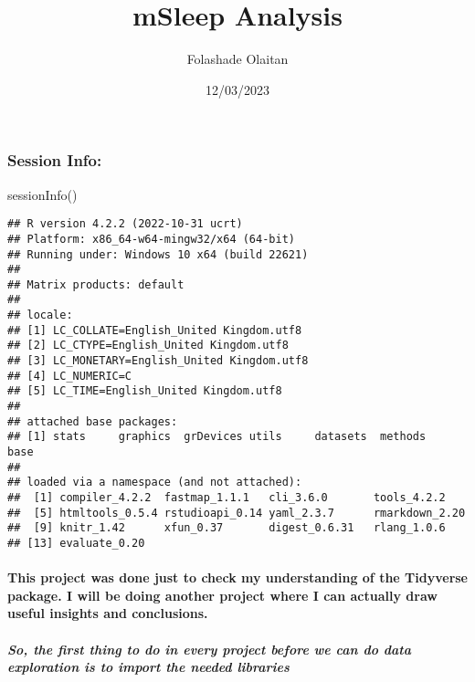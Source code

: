 \documentclass[
]{article}
\title{mSleep Analysis}
\author{Folashade Olaitan}
\date{12/03/2023}
\newenvironment{Shaded}{\begin{snugshade}}{\end{snugshade}}
\newcommand{\FunctionTok}[1]{\textcolor[rgb]{0.00,0.00,0.00}{#1}}
\newcommand{\NormalTok}[1]{#1}
\begin{document}
\maketitle

{
\setcounter{tocdepth}{2}
\tableofcontents
}
\hypertarget{session-info}{%
\subsubsection{Session Info:}\label{session-info}}

\begin{Shaded}
\begin{Highlighting}[]
\FunctionTok{sessionInfo}\NormalTok{()}
\end{Highlighting}
\end{Shaded}

\begin{verbatim}
## R version 4.2.2 (2022-10-31 ucrt)
## Platform: x86_64-w64-mingw32/x64 (64-bit)
## Running under: Windows 10 x64 (build 22621)
## 
## Matrix products: default
## 
## locale:
## [1] LC_COLLATE=English_United Kingdom.utf8 
## [2] LC_CTYPE=English_United Kingdom.utf8   
## [3] LC_MONETARY=English_United Kingdom.utf8
## [4] LC_NUMERIC=C                           
## [5] LC_TIME=English_United Kingdom.utf8    
## 
## attached base packages:
## [1] stats     graphics  grDevices utils     datasets  methods   base     
## 
## loaded via a namespace (and not attached):
##  [1] compiler_4.2.2  fastmap_1.1.1   cli_3.6.0       tools_4.2.2    
##  [5] htmltools_0.5.4 rstudioapi_0.14 yaml_2.3.7      rmarkdown_2.20 
##  [9] knitr_1.42      xfun_0.37       digest_0.6.31   rlang_1.0.6    
## [13] evaluate_0.20
\end{verbatim}

\hypertarget{this-project-was-done-just-to-check-my-understanding-of-the-tidyverse-package.-i-will-be-doing-another-project-where-i-can-actually-draw-useful-insights-and-conclusions.}{%
\paragraph{This project was done just to check my understanding of the
Tidyverse package. I will be doing another project where I can actually
draw useful insights and
conclusions.}\label{this-project-was-done-just-to-check-my-understanding-of-the-tidyverse-package.-i-will-be-doing-another-project-where-i-can-actually-draw-useful-insights-and-conclusions.}}

\hypertarget{so-the-first-thing-to-do-in-every-project-before-we-can-do-data-exploration-is-to-import-the-needed-libraries}{%
\subparagraph{\texorpdfstring{So, the first thing to do in every project
before we can do data exploration is to import the needed
\textbf{\emph{libraries}}}{So, the first thing to do in every project before we can do data exploration is to import the needed libraries}}\label{so-the-first-thing-to-do-in-every-project-before-we-can-do-data-exploration-is-to-import-the-needed-libraries}}
\end{document}
